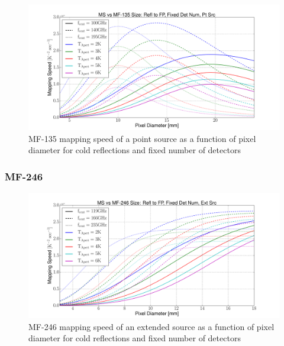 \documentclass[12pt, titlepage]{article} %
\begin{document}
\begin{figure}[H]
	\centering
	\includegraphics[width=1.1\textwidth, center]{PDF/LFT_MS_MF-135_coldRefl_fixDetNum_ptSrc.pdf}
	\caption{MF-135 mapping speed of a point source as a function of pixel diameter for cold reflections and fixed number of detectors}
\end{figure}


\subsubsection{MF-246}

\begin{figure}[H]
	\centering
	\includegraphics[width=1.1\textwidth, center]{PDF/LFT_MS_MF-246_coldRefl_fixDetNum_extSrc.pdf}
	\caption{MF-246 mapping speed of an extended source as a function of pixel diameter for cold reflections and fixed number of detectors}
\end{figure}
\end{document}
